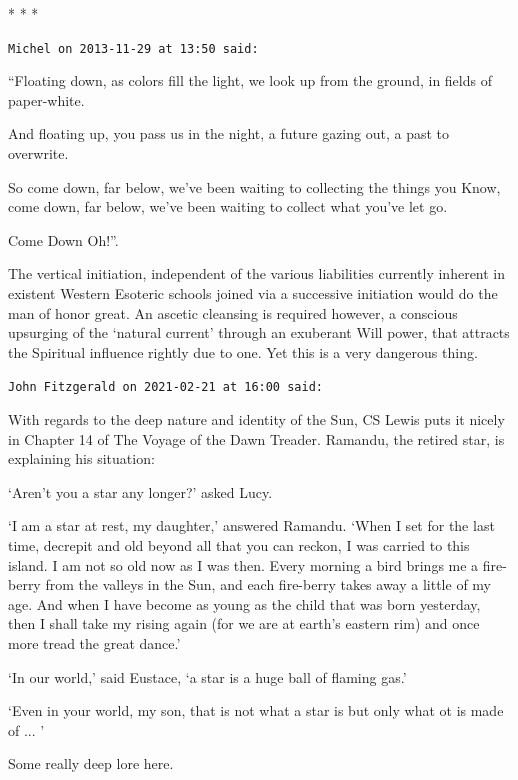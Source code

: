 
\begin{center}* * *\end{center}

\begin{footnotesize}
\begin{sffamily}
\texttt{Michel on 2013-11-29 at 13:50 said:}

``Floating down, as colors fill the light, we look up from the ground, in fields of paper-white.

And floating up, you pass us in the night, a future gazing out, a past to overwrite.

So come down, far below, we've been waiting to collecting the things you Know, come down, far below, we've been waiting to collect what you've let go.

Come Down Oh!''.

The vertical initiation, independent of the various liabilities currently inherent in existent Western Esoteric schools joined via a successive initiation would do the man of honor great. An ascetic cleansing is required however, a conscious upsurging of the `natural current' through an exuberant Will power, that attracts the Spiritual influence rightly due to one. Yet this is a very dangerous thing.

\hfill

\texttt{John Fitzgerald on 2021-02-21 at 16:00 said:}

With regards to the deep nature and identity of the Sun, CS Lewis puts it nicely in Chapter 14 of The Voyage of the Dawn Treader. Ramandu, the retired star, is explaining his situation:

`Aren't you a star any longer?' asked Lucy.

`I am a star at rest, my daughter,' answered Ramandu. `When I set for the last time, decrepit and old beyond all that you can reckon, I was carried to this island. I am not so old now as I was then. Every morning a bird brings me a fire-berry from the valleys in the Sun, and each fire-berry takes away a little of my age. And when I have become as young as the child that was born yesterday, then I shall take my rising again (for we are at earth's eastern rim) and once more tread the great dance.'

`In our world,' said Eustace, `a star is a huge ball of flaming gas.'

`Even in your world, my son, that is not what a star is but only what ot is made of ... '

Some really deep lore here.


\hfill

\end{sffamily}
\end{footnotesize}

